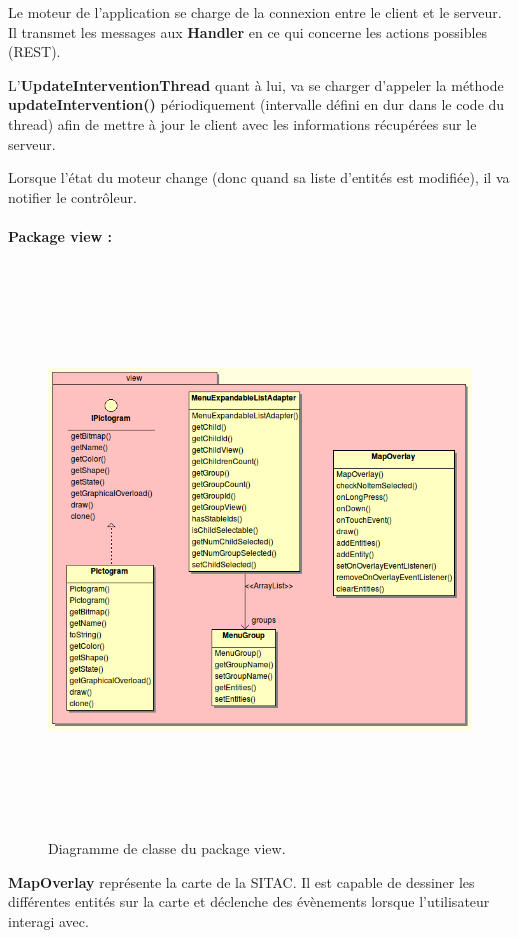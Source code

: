 \documentclass{article}
\begin{document}
Le moteur de l’application se charge de la connexion entre le client et le serveur. Il transmet les messages aux \textbf{Handler} en ce qui concerne les actions possibles (REST).

L’\textbf{UpdateInterventionThread} quant à lui, va se charger d’appeler la méthode \textbf{updateIntervention()} périodiquement (intervalle défini en dur dans le code du thread) afin de mettre à jour le client avec les informations récupérées sur le serveur.

Lorsque l’état du moteur change (donc quand sa liste d'entités est modifiée), il va notifier le contrôleur.
\newpage

\paragraph{Package view :}
\begin{figure}[htbp]
\begin{center}
\includegraphics[width=499pt, height=427pt]{doc_dev-fig009.png}
\caption{Diagramme de classe du package view.}
\end{center}
\end{figure}


\textbf{MapOverlay} représente la carte de la SITAC. Il est capable de dessiner les différentes entités sur la carte et déclenche des évènements lorsque l’utilisateur interagi avec.
\end{document}
